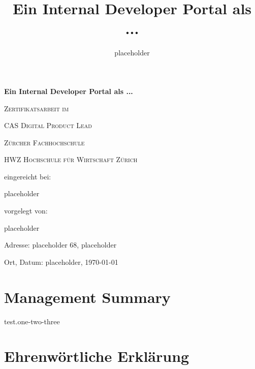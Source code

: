 \documentclass[a4paper,12pt]{article}
\title{Ein Internal Developer Portal als ... }
\author{placeholder}
\begin{document}
    \begin{titlepage}
        \begin{center}
        {\huge\bfseries Ein Internal Developer Portal als ...\par}
            \vspace{2cm}

            {\scshape\large Zertifikatsarbeit im \par}
            {\scshape\large CAS Digital Product Lead \par}
            \vspace{1cm}

            {\scshape\large Zürcher Fachhochschule \par}
            {\scshape\large HWZ Hochschule für Wirtschaft Zürich \par}
            \vspace{4cm}

            {\normalsize eingereicht bei:\par}
            \vspace{0.5cm}

            {\large placeholder\par}
            \vfill
            {\normalsize vorgelegt von:\par}
            \vspace{0.5cm}
            {\large placeholder\par}
            \vspace{0.5cm}
            {\normalsize Adresse: placeholder 68, placeholder\par}
            {\normalsize  Ort, Datum: placeholder, \today\par}

        \end{center}
    \end{titlepage}


    \section{Management Summary}

    test.one-two\cite{backstageio}-three
    \pagebreak


    \tableofcontents
    \pagebreak


    \section{Ehrenwörtliche Erklärung}
\end{document}
